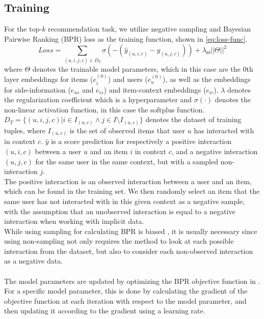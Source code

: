 \subsection{Training}\label{subsec:csgcn_is_training}
For the top-$k$ recommendation task, we utilize negative sampling and Bayesian Pairwise Ranking (BPR) loss \cite{BPR} as the training function, shown in \autoref{eq:loss-func}.
\begin{equation}\label{eq:loss-func}
    Loss = \sum_{(u,i,j,c) \in D_T} \sigma(-(\hat{y}_{(u,i,c)} - \hat{y}_{(u,j,c)})) + \lambda_\Theta ||\Theta||^2
\end{equation}
where $\Theta$ denotes the trainable model parameters, which in this case are the 0th layer embeddings for items ($e_{i}^{(0)}$) and users ($e_{u}^{(0)}$), as well as the embeddings for side-information ($e_{us}$ and $e_{is}$) and item-context embeddings ($e_{ic}$). $\lambda$ denotes the regularization coefficient which is a hyperparameter and $\sigma(\cdot)$ denotes the non-linear activation function, in this case the softplus function.\\ 
$D_T = \{(u,i,j,c) | i \in I_{(u,c)} \wedge  j \in I \setminus I_{(u,c)}\}$ denotes the dataset of training tuples, where $I_{(u,c)}$ is the set of observed items that user $u$ has interacted with in context $c$.
$\hat{y}$ is a score prediction for respectively a positive interaction $(u,i,c)$ between a user $u$ and an item $i$ in context $c$, and a negative interaction $(u,j,c)$ for the same user in the same context, but with a sampled non-interaction $j$.
\\
The positive interaction is an observed interaction between a user and an item, which can be found in the training set.
We then randomly select an item that the same user has not interacted with in this given context as a negative sample, with the assumption that an unobserved interaction is equal to a negative interaction when working with implicit data.\\
While using sampling for calculating BPR is biased \cite{nonsampling}, it is usually necessary since using non-sampling not only requires the method to look at each possible interaction from the dataset, but also to consider each non-observed interaction as a negative data.
\\\\
The model parameters are updated by optimizing the BPR objective function in .
For a specific model parameter, this is done by calculating the gradient of the objective function at each iteration with respect to the model parameter, and then updating it according to the gradient using a learning rate. 

